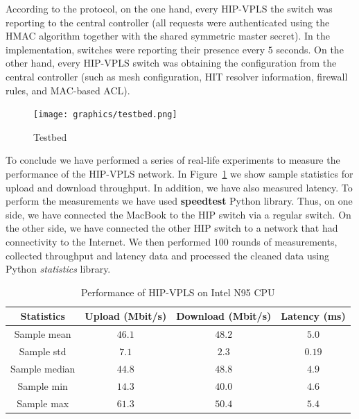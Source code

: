 According to the protocol, on the one hand, every HIP-VPLS 
the switch was reporting to the central controller (all requests were authenticated 
using the HMAC algorithm together with the shared symmetric 
master secret). In the implementation, switches were reporting 
their presence every $5$ seconds. On the other hand, every HIP-VPLS switch was obtaining 
the configuration from the central controller (such as mesh 
configuration, HIT resolver information, firewall rules, and 
MAC-based ACL). 

\begin{figure}[!ht]
    \centering
    \texttt{[image: graphics/testbed.png]}
    \caption{Testbed}
    \label{fig:testbed}
\end{figure}

To conclude we have performed a series of real-life experiments to measure the 
performance of the HIP-VPLS network. In Figure~\ref{tab:vpls-performance} we show
sample statistics for upload and download throughput. In addition, we have also
measured latency. To perform the measurements we have used {\bf speedtest}
Python library. Thus, on one side, we have connected the MacBook to the HIP switch via a regular
switch. On the other side, we have connected the other HIP switch to a network 
that had connectivity to the Internet. We then performed $100$ rounds of measurements,
collected throughput and latency data and processed the cleaned data using Python
{\it statistics} library.

\begin{table}
    \centering
    \begin{tabular}{|c|c|c|c|}
    \hline
    Statistics     & Upload (Mbit/s)        & Download (Mbit/s)     & Latency (ms) \\\hline
    Sample mean    & $46.1$                  & $48.2$                 & $5.0$         \\
    Sample std     & $7.1$                   & $2.3$                  & $0.19$        \\
    Sample median  & $44.8$                  & $48.8$                 & $4.9$         \\
    Sample min     & $14.3$                  & $40.0$                 & $4.6$         \\
    Sample max     & $61.3$                  & $50.4$                 & $5.4$         \\
    \hline
    \end{tabular}
    \caption{Performance of HIP-VPLS on Intel N95 CPU}  
    \label{tab:vpls-performance}
\end{table}

